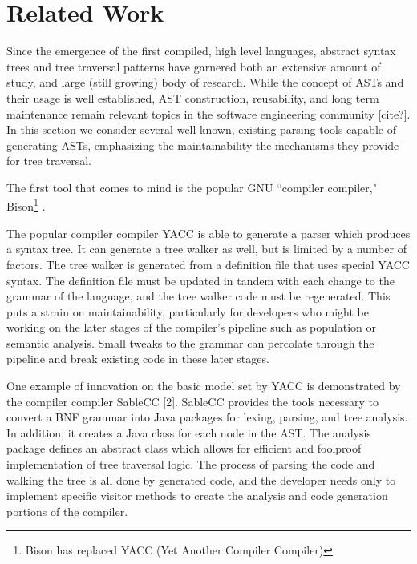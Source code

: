 \documentclass[times]{speauth}
\begin{document}
\vspace{-6pt}


\section{Related Work}
\vspace{-2pt}

Since the emergence of the first compiled, high level languages, abstract syntax trees and tree traversal patterns have garnered both an extensive amount of study, and large (still growing) body of research. While the concept of ASTs and their usage is well established, AST construction, reusability, and long term maintenance remain relevant topics in the software engineering community [cite?]. In this section we consider several well known, existing parsing tools capable of generating ASTs, emphasizing the maintainability  the mechanisms they provide for tree traversal.

The first tool that comes to mind is the popular GNU ``compiler compiler," Bison\footnote{Bison has replaced YACC (Yet Another Compiler Compiler)} \cite{levine:1992}. 

The popular compiler compiler YACC is able to generate a parser which produces a syntax tree. It can generate a tree walker as well, but is limited by a number of factors. The tree walker is generated from a definition file that uses special YACC syntax. The definition file must be updated in tandem with each change to the grammar of the language, and the tree walker code must be regenerated. This puts a strain on maintainability, particularly for developers who might be working on the later stages of the compiler's pipeline such as population or semantic analysis. Small tweaks to the grammar can percolate through the pipeline and break existing code in these later stages. 

One example of innovation on the basic model set by YACC is demonstrated by the compiler compiler SableCC [2]. SableCC provides the tools necessary to convert a BNF grammar into Java packages for lexing, parsing, and tree analysis. In addition, it creates a Java class for each node in the AST. The analysis package defines an abstract class which allows for efficient and foolproof implementation of tree traversal logic. The process of parsing the code and walking the tree is all done by generated code, and the developer needs only to implement specific visitor methods to create the analysis and code generation portions of the compiler.
\end{document}
